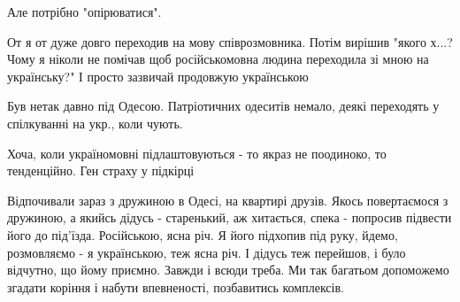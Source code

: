 \begin{itemize}
Але потрібно "опірюватися".

 

От я от дуже довго переходив на мову співрозмовника. Потім вирішив "якого х...?
Чому я ніколи не помічав щоб російськомовна людина переходила зі мною на
українську?" І просто зазвичай продовжую українською

\begin{itemize}
 
Був нетак давно під Одесою. Патріотичних одеситів немало, деякі переходять у спілкуванні на укр., коли чують.

 
Хоча, коли україномовні підлаштовуються - то якраз не поодиноко, то тенденційно. Ген страху у підкірці
\end{itemize}

 

Відпочивали зараз з дружиною в Одесі, на квартирі друзів. Якось повертаємося з
дружиною, а якийсь дідусь - старенький, аж хитається, спека - попросив підвести
його до під'їзда. Російською, ясна річ. Я його підхопив під руку, йдемо,
розмовляємо - я українською, теж ясна річ. І дідусь теж перейшов, і було
відчутно, що йому приємно. Завжди і всюди треба. Ми так багатьом допоможемо
згадати коріння і набути впевненості, позбавитись комплексів.


 


\end{itemize}
